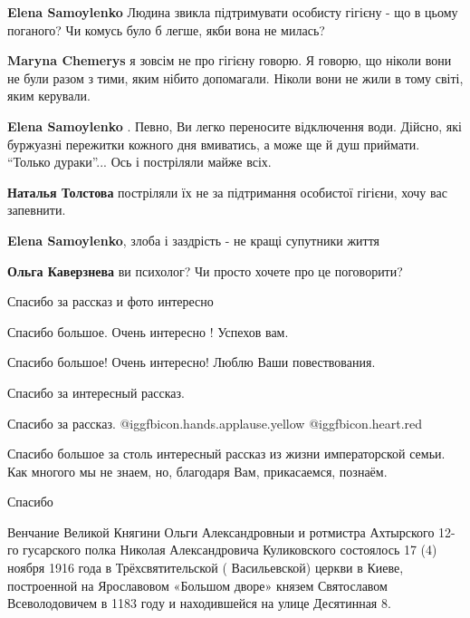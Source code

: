 \begin{itemize}
\begin{itemize}
\textbf{Elena Samoylenko} Людина звикла підтримувати особисту гігієну - що в цьому поганого? Чи комусь було б легше, якби вона не милась?

\textbf{Maryna Chemerys} я зовсім не про гігієну говорю. Я говорю, що ніколи вони не були разом з тими, яким нібито допомагали. Ніколи вони не жили в тому світі, яким керували.

\textbf{Elena Samoylenko} . Певно, Ви легко переносите відключення води. Дійсно, які буржуазні пережитки кожного дня вмиватись, а може ще й душ приймати.
\enquote{Только дураки}... Ось і постріляли майже всіх.

\textbf{Наталья Толстова} постріляли їх не за підтримання особистої гігієни, хочу вас запевнити.

\textbf{Elena Samoylenko}, злоба і заздрість - не кращі супутники життя

\textbf{Ольга Каверзнева} ви психолог? Чи просто хочете про це поговорити?


\end{itemize} %

Спасибо за рассказ и фото интересно

Спасибо большое. Очень интересно ! Успехов вам.

Спасибо большое! Очень интересно! Люблю Ваши повествования.

Спасибо за интересный рассказ.

Спасибо за рассказ.  @igg{fbicon.hands.applause.yellow} @igg{fbicon.heart.red}


Спасибо большое за столь интересный рассказ из жизни императорской семьи. Как
многого мы не знаем, но, благодаря Вам, прикасаемся, познаём.


Спасибо


Венчание Великой Княгини Ольги Александровныи и ротмистра Ахтырского 12-го
гусарского полка Николая Александровича Куликовского состоялось 17 (4) ноября
1916 года в Трёхсвятительской ( Васильевской) церкви в Киеве, построенной на
Ярославовом «Большом дворе» князем Святославом Всеволодовичем в 1183 году и
находившейся на улице Десятинная 8.


\end{itemize}
